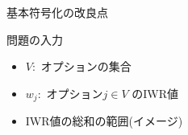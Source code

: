 \documentclass[dvipdfmx, 11pt]{beamer}
\begin{document}
\begin{frame}{基本符号化の改良点}
 \begin{block}{問題の入力}
  \begin{multicols}{2}
  \begin{itemize}
   \item $V$:\ オプションの集合
   \item $w_j$:\ オプション$j \in V$ のIWR値
  \end{itemize}
  \end{multicols}
 \end{block}
 \begin{itemize}
  \item IWR値の総和の範囲(イメージ)
 \end{itemize}
 \begin{center}
   
 \end{center}
 \vspace{-3ex}

\end{frame}
\end{document}
